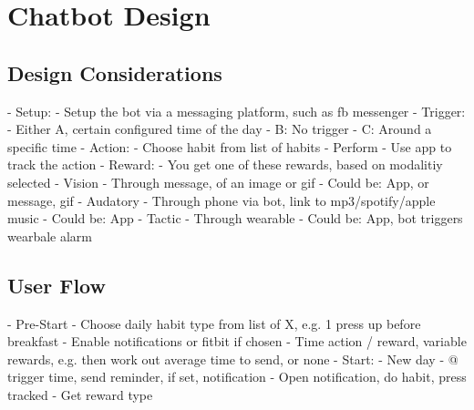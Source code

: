 
\newpage
\section{Chatbot Design}
  \subsection{Design Considerations}
    - Setup:
      - Setup the bot via a messaging platform, such as fb messenger
    - Trigger:
        - Either A, certain configured time of the day
        -        B: No trigger
        -        C: Around a specific time
    - Action:
      - Choose habit from list of habits
      - Perform
      - Use app to track the action
    - Reward:
      - You get one of these rewards, based on modalitiy selected
      - Vision
        - Through message, of an image or gif
        - Could be: App, or message, gif
      - Audatory
        - Through phone via bot, link to mp3/spotify/apple music
        - Could be: App
      - Tactic
        - Through wearable
        - Could be: App, bot triggers wearbale alarm



  \subsection{User Flow}
      - Pre-Start
        - Choose daily habit type from list of X, e.g. 1 press up before breakfast
        - Enable notifications or fitbit if chosen
        - Time action / reward, variable rewards, e.g. then work out average time to send, or none
      - Start:
        - New day
        - @ trigger time, send reminder, if set, notification
        - Open notification, do habit, press tracked
        - Get reward type

